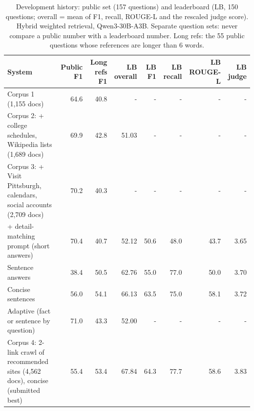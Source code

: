 \begin{table}[t]
\centering
\small
\begin{tabular}{p{}rrrrrrr}
\toprule
System & Public F1 & Long refs F1 & LB overall & LB F1 & LB recall & LB ROUGE-L & LB judge \\
\midrule
Corpus 1 (1,155 docs) & 64.6 & 40.8 & - & - & - & - & - \\
Corpus 2: + college schedules, Wikipedia lists (1,689 docs) & 69.9 & 42.8 & 51.03 & - & - & - & - \\
Corpus 3: + Visit Pittsburgh, calendars, social accounts (2,709 docs) & 70.2 & 40.3 & - & - & - & - & - \\
+ detail-matching prompt (short answers) & 70.4 & 40.7 & 52.12 & 50.6 & 48.0 & 43.7 & 3.65 \\
Sentence answers & 38.4 & 50.5 & 62.76 & 55.0 & 77.0 & 50.0 & 3.70 \\
Concise sentences & 56.0 & 54.1 & 66.13 & 63.5 & 75.0 & 58.1 & 3.72 \\
Adaptive (fact or sentence by question) & 71.0 & 43.3 & 52.00 & - & - & - & - \\
Corpus 4: 2-link crawl of recommended sites (4,562 docs), concise (submitted best) & 55.4 & 53.4 & 67.84 & 64.3 & 77.7 & 58.6 & 3.83 \\
\bottomrule
\end{tabular}
\caption{Development history: public set (157 questions) and leaderboard (LB, 150 questions; overall = mean of F1, recall, ROUGE-L and the rescaled judge score). Hybrid weighted retrieval, Qwen3-30B-A3B. Separate question sets: never compare a public number with a leaderboard number. Long refs: the 55 public questions whose references are longer than 6 words.}
\label{tab:progression}
\end{table}
